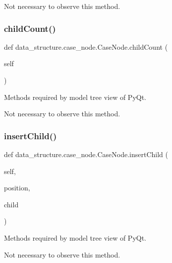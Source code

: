 Not necessary to observe this method. \hypertarget{classdata__structure_1_1case__node_1_1_case_node_a1151098cb931c0dac5e36b5a430ee831}{}\label{classdata__structure_1_1case__node_1_1_case_node_a1151098cb931c0dac5e36b5a430ee831} 
\subsubsection{\texorpdfstring{child\+Count()}{childCount()}}
{\footnotesize\ttfamily def data\+\_\+structure.\+case\+\_\+node.\+Case\+Node.\+child\+Count (\begin{DoxyParamCaption}\item[{}]{self }\end{DoxyParamCaption})}



Methods required by model tree view of Py\+Qt. 

Not necessary to observe this method. \hypertarget{classdata__structure_1_1case__node_1_1_case_node_a9f706863d3146d479a3be6d7737a6102}{}\label{classdata__structure_1_1case__node_1_1_case_node_a9f706863d3146d479a3be6d7737a6102} 
\subsubsection{\texorpdfstring{insert\+Child()}{insertChild()}}
{\footnotesize\ttfamily def data\+\_\+structure.\+case\+\_\+node.\+Case\+Node.\+insert\+Child (\begin{DoxyParamCaption}\item[{}]{self,  }\item[{}]{position,  }\item[{}]{child }\end{DoxyParamCaption})}



Methods required by model tree view of Py\+Qt. 

Not necessary to observe this method. \hypertarget{classdata__structure_1_1case__node_1_1_case_node_a73e2e5313f50260c6c767fef3c4b3ced}{}\label{classdata__structure_1_1case__node_1_1_case_node_a73e2e5313f50260c6c767fef3c4b3ced} 
